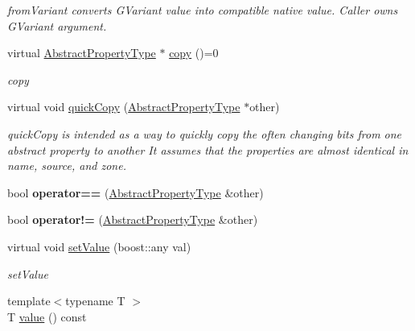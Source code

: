 \begin{DoxyCompactItemize}
\begin{DoxyCompactList}\small\item\em from\+Variant converts G\+Variant value into compatible native value. Caller owns G\+Variant argument. \end{DoxyCompactList}\item 
virtual \hyperlink{classAbstractPropertyType}{Abstract\+Property\+Type} $\ast$ \hyperlink{classAbstractPropertyType_a8fedd4300acc7ba7ada94e964f2fd166}{copy} ()=0
\begin{DoxyCompactList}\small\item\em copy \end{DoxyCompactList}\item 
virtual void \hyperlink{classAbstractPropertyType_a0996989d0082ad3f621fec938b60ed10}{quick\+Copy} (\hyperlink{classAbstractPropertyType}{Abstract\+Property\+Type} $\ast$other)
\begin{DoxyCompactList}\small\item\em quick\+Copy is intended as a way to quickly copy the often changing bits from one abstract property to another It assumes that the properties are almost identical in name, source, and zone. \end{DoxyCompactList}\item 
\hypertarget{classAbstractPropertyType_af156588f45c7b2f2107a8ebb8977e71f}{bool {\bfseries operator==} (\hyperlink{classAbstractPropertyType}{Abstract\+Property\+Type} \&other)}\label{classAbstractPropertyType_af156588f45c7b2f2107a8ebb8977e71f}

\item 
\hypertarget{classAbstractPropertyType_a137d170e61776d59cff141d2df7cab9b}{bool {\bfseries operator!=} (\hyperlink{classAbstractPropertyType}{Abstract\+Property\+Type} \&other)}\label{classAbstractPropertyType_a137d170e61776d59cff141d2df7cab9b}

\item 
virtual void \hyperlink{classAbstractPropertyType_a1b2598b86718911533587a5bd41bfb9c}{set\+Value} (boost\+::any val)
\begin{DoxyCompactList}\small\item\em set\+Value \end{DoxyCompactList}\item 
\hypertarget{classAbstractPropertyType_ae723621925382263eba046fa1ca8e36d}{{\footnotesize template$<$typename T $>$ }\\T \hyperlink{classAbstractPropertyType_ae723621925382263eba046fa1ca8e36d}{value} () const }\label{classAbstractPropertyType_ae723621925382263eba046fa1ca8e36d}


\end{DoxyCompactItemize}
